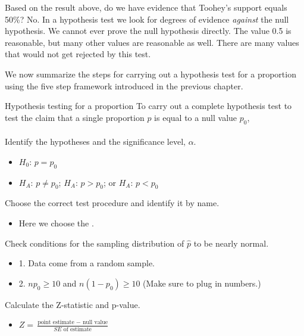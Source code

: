 \begin{examplewrap}
\begin{nexample}{Based on the result above, do we have evidence that Toohey's support equals 50\%?}
No.  In a hypothesis test we look for degrees of evidence \emph{against} the null hypothesis.  We cannot ever prove the null hypothesis directly.  The value 0.5 is reasonable, but many other values are reasonable as well.  There are many values that would not get rejected by this test.
\end{nexample}
\end{examplewrap}

We now summarize the steps for carrying out a hypothesis test for a proportion using the five step framework introduced in the previous chapter.

\begin{onebox}{Hypothesis testing for a proportion}
To carry out a complete hypothesis test to test the claim that a single proportion $p$ is equal to a null value $p_0$,
\\
\\
 Identify the hypotheses and the significance level, $\alpha$.\vspace{-1mm}
\begin{itemize}
\setlength{\itemsep}{0mm}
\item[] $H_0$: $p = p_0$  
\item[]  $H_A$: $p \ne p_0$;  \quad $H_A$: $p > p_0$; \quad or \quad $H_A$: $p < p_0$ 
\end{itemize} 
 Choose the correct test procedure and identify it by name.  \vspace{-1mm}
\begin{itemize}
\item[] Here we choose the .
\end{itemize}
  Check conditions for the sampling distribution of $\hat{p}$ to be nearly normal.\vspace{-1mm}
\begin{itemize}
\setlength{\itemsep}{0mm}
\item[] 1. Data come from a random sample.
\item[] 2. $np_0\geq10$ and $n(1-p_0)\geq10$ \quad  (Make sure to plug in numbers.) 
\end{itemize}
  Calculate the Z-statistic and p-value.
\begin{itemize}
\item[] $Z = \frac{\text{point estimate } - \text{ null value}}{SE \text{ of estimate}}$

\end{itemize}
\end{onebox}
